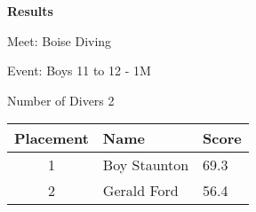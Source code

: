 \documentclass[12pt, letterpaper, landscape]{article}
\begin{document}
	\begin{center}
		\textbf{Results}
	\end{center}
	
    Meet: Boise Diving
    
    Event: Boys 11 to 12 - 1M

	Number of Divers 2
	
	\begin{table}[h]
		\centering
			\begin{tabularx}{\textwidth}{|c X X|}
			Placement&Name&Score\\\midrule
            1&Boy Staunton&69.3\\\midrule
2&Gerald Ford&56.4\\\midrule

		\end{tabularx}
	\end{table}
\end{document}
